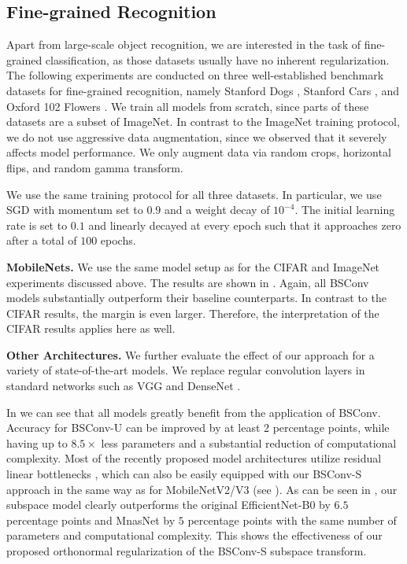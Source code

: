 \documentclass[10pt,twocolumn,letterpaper]{article}
\newcommand{\DCCK}{BSConv\xspace}
\newcommand{\DCCKU}{\DCCK-U\xspace}
\newcommand{\DCCKS}{\DCCK-S\xspace}
\begin{document}
\subsection{Fine-grained Recognition}
Apart from large-scale object recognition, we are interested in the task of fine-grained classification, as those datasets usually have no inherent regularization.
The following experiments are conducted on three well-established benchmark datasets for fine-grained recognition, namely Stanford Dogs \cite{Khosla2011dogs}, Stanford Cars \cite{KrauseStarkDengFei-Fei_3DRR2013}, and Oxford 102 Flowers \cite{nilsback2008automated}.
We train all models from scratch, since parts of these datasets are a subset of ImageNet.
In contrast to the ImageNet training protocol, we do not use aggressive data augmentation, since we observed that it severely affects model performance.
We only augment data via random crops, horizontal flips, and random gamma transform.

We use the same training protocol for all three datasets.
In particular, we use SGD with momentum set to $0.9$ and a weight decay of $10^{-4}$.
The initial learning rate is set to $0.1$ and linearly decayed at every epoch such that it approaches zero after a total of $100$ epochs.

\textbf{MobileNets.}
We use the same model setup as for the \mbox{CIFAR} and ImageNet experiments discussed above.
The results are shown in .
Again, all \DCCK models substantially outperform their baseline counterparts.
In contrast to the CIFAR results, the margin is even larger.
Therefore, the interpretation of the CIFAR results applies here as well.

\textbf{Other Architectures.}
We further evaluate the effect of our approach for a variety of state-of-the-art models.
We replace regular convolution layers in standard networks such as VGG \cite{simonyan2014very} and DenseNet \cite{huang2017densely}.

In  we can see that all models greatly benefit from the application of \DCCK.
Accuracy for \DCCKU can be improved by at least 2 percentage points, while having up to $8.5 \times$ less parameters and a substantial reduction of computational complexity.
Most of the recently proposed model architectures utilize residual linear bottlenecks \cite{sandler2018mobilenetv2}, which can also be easily equipped with our \DCCKS approach in the same way as for MobileNetV2/V3 (see ).
As can be seen in , our subspace model clearly outperforms the original EfficientNet-B0 \cite{tan2019efficientnet} by $6.5$ percentage points and MnasNet \cite{tan2019mnasnet} by $5$ percentage points with the same number of parameters and computational complexity.
This shows the effectiveness of our proposed orthonormal regularization of the \DCCKS subspace transform.
\end{document}
